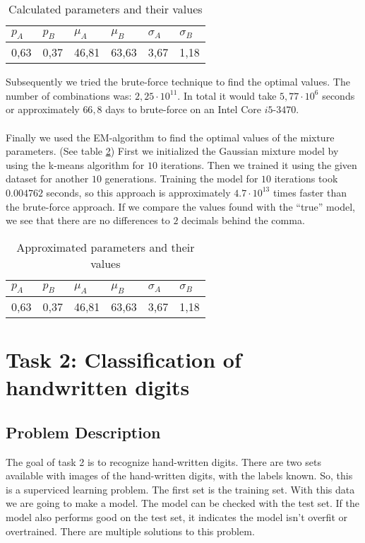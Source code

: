 \documentclass{article}
\begin{document}
\begin{table}[H]
	\begin{center}
		\begin{tabular}{l|l|l|l|l|l}
			$p_A$ & $p_B$ & $\mu_A$ & $\mu_B$ & $\sigma_A$ & $\sigma_B$ \\
			\hline
			0,63 & 0,37 & 46,81 & 63,63 & 3,67 & 1,18 \\
		\end{tabular}
		\caption{Calculated parameters and their values}
		\label{table:data2}
	\end{center}
\end{table}

Subsequently we tried the brute-force technique to find the optimal values. The number of combinations was: $2,25 \cdot 10^{11}$. In total it would take $5,77 \cdot 10^6$ seconds or approximately $66,8$ days to brute-force on an Intel Core $i5$-$3470$.\\\\

Finally we used the EM-algorithm to find the optimal values of the mixture parameters. (See table \ref{table:data3}) First we initialized the Gaussian mixture model by using the k-means algorithm for $10$ iterations. Then we trained it using the given dataset for another $10$ generations. Training the model for $10$ iterations took  $0.004762$ seconds, so this approach is approximately $4.7 \cdot 10^{13}$ times faster than the brute-force approach. If we compare the values found with the ``true'' model, we see that there are no differences to $2$ decimals behind the comma. 

\begin{table}[!h]
	\begin{center}
		\begin{tabular}{l|l|l|l|l|l}
			$p_A$ & $p_B$ & $\mu_A$ & $\mu_B$ & $\sigma_A$ & $\sigma_B$ \\
			\hline
			0,63 & 0,37 & 46,81 & 63,63 & 3,67 & 1,18 \\
		\end{tabular}
		\caption{Approximated parameters and their values}
		\label{table:data3}
	\end{center}
\end{table}


\section{Task 2: Classiﬁcation of handwritten digits}
\subsection{Problem Description}
The goal of task 2 is to recognize hand-written digits. There are two sets available with images of the hand-written digits, with the labels known. So, this is a superviced learning problem. The first set is the training set. With this data we are going to make a model. The model can be checked with the test set. If the model also performs good on the test set, it indicates the model isn't overfit or overtrained. There are multiple solutions to this problem.
\end{document}
